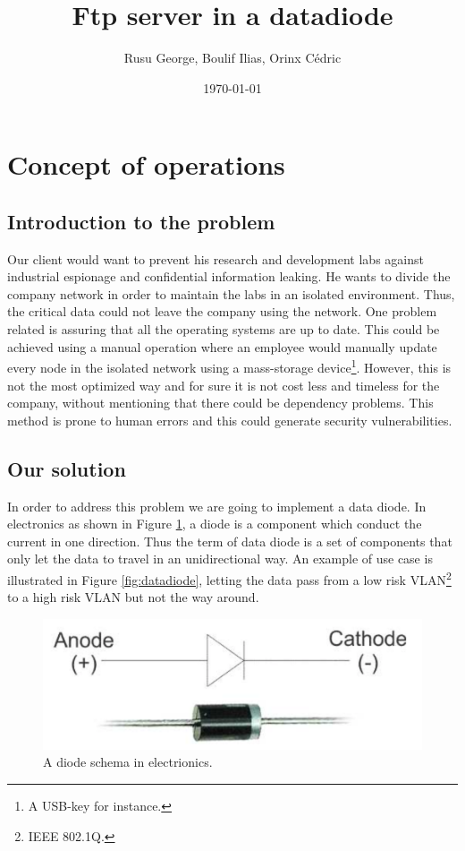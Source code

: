\documentclass[a4paper,10pt]{article}
\title{Ftp server in a datadiode}
\author{Rusu George, Boulif Ilias, Orinx Cédric}
\date{\today}
\begin{document}
\maketitle
\newpage
\tableofcontents
\newpage
\section{Concept of operations}
\subsection{Introduction to the problem}
Our client would want to prevent his research and development labs against industrial espionage and confidential information leaking. He wants to divide the company network in order to maintain the labs in an isolated environment. Thus, the critical data could not leave the company using the network. One problem related is assuring that all the operating systems are up to date. This could be achieved using a manual operation where an employee would manually update every node in the isolated network using a mass-storage device\footnote{A USB-key for instance.}. However, this is not the most optimized way and for sure it is not cost less and timeless for the company, without mentioning that there could be dependency problems. This method is prone to human errors and this could generate security vulnerabilities.

\subsection{Our solution}
In order to address this problem we are going to implement a data diode. In electronics as shown in Figure \ref{fig:diode}, a diode is a component which conduct the current in one direction. Thus the term of data diode is a set of components that only let the data to travel in an unidirectional way. An example of use case is illustrated in Figure \ref{fig:datadiode}, letting the data pass from a low risk VLAN\footnote{IEEE 802.1Q.} to a high risk VLAN but not the way around.
\begin{figure}
\centering
\includegraphics[scale=0.25]{images/diode.png}
\caption{A diode schema in electrionics.}
\label{fig:diode}
\end{figure}
\end{document}
